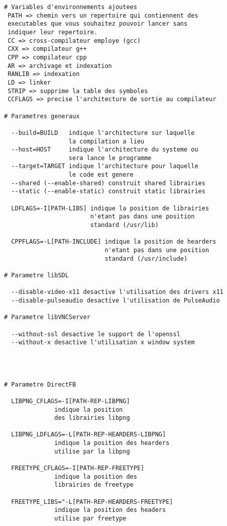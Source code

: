 \begin{lstlisting}
# Variables d'environnements ajoutees
 PATH => chemin vers un repertoire qui contiennent des
 executables que vous souhaitez pouvoir lancer sans
 indiquer leur repertoire.
 CC => cross-compilateur employe (gcc)
 CXX => compilateur g++
 CPP => compilateur cpp
 AR => archivage et indexation
 RANLIB => indexation
 LD => linker
 STRIP => supprime la table des symboles
 CCFLAGS => precise l'architecture de sortie au compilateur

# Parametres generaux
  
  --build=BUILD   indique l'architecture sur laquelle
                  la compilation a lieu
  --host=HOST     indique l'architecture du systeme ou
                  sera lance le programme   
  --target=TARGET indique l'architecture pour laquelle
                  le code est genere
  --shared (--enable-shared) construit shared librairies
  --static (--enable-static) construit static librairies
 
  LDFLAGS=-I[PATH-LIBS] indique la position de librairies
                        n'etant pas dans une position
                        standard (/usr/lib)
  
  CPPFLAGS=-L[PATH-INCLUDE] indique la position de hearders
                            n'etant pas dans une position
                            standard (/usr/include)
  
# Parametre libSDL

  --disable-video-x11 desactive l'utilisation des drivers x11 
  --disable-pulseaudio desactive l'utilisation de PulseAudio
  
# Parametre libVNCServer  

  --without-ssl desactive le support de l'openssl
  --without-x desactive l'utilisation x window system
  
  
  
  
# Parametre DirectFB 

  LIBPNG_CFLAGS=-I[PATH-REP-LIBPNG]
              indique la position
              des librairies libpng
  
  LIBPNG_LDFLAGS=-L[PATH-REP-HEARDERS-LIBPNG] 
              indique la position des hearders 
              utilise par la libpng
  
  FREETYPE_CFLAGS=-I[PATH-REP-FREETYPE]
              indique la position des
              librairies de freetype
 
  FREETYPE_LIBS="-L[PATH-REP-HEARDERS-FREETYPE] 
              indique la position des headers
              utilise par freetype
 

\end{lstlisting}
